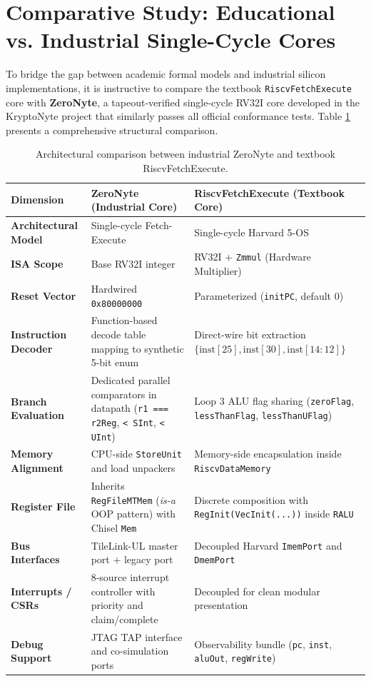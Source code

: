 \section{Comparative Study: Educational vs. Industrial Single-Cycle Cores}\label{riscvComparison}

To bridge the gap between academic formal models and industrial silicon implementations, it is instructive to compare the textbook \texttt{RiscvFetchExecute} core with \textbf{ZeroNyte}, a tapeout-verified single-cycle RV32I core developed in the KryptoNyte project that similarly passes all official conformance tests. Table \ref{tab:core_comparison} presents a comprehensive structural comparison.

\begin{table}[htbp]
\centering
\small
\begin{tabular}{|l|p{6cm}|p{6cm}|}
\hline
\textbf{Dimension} & \textbf{ZeroNyte (Industrial Core)} & \textbf{RiscvFetchExecute (Textbook Core)} \\
\hline
\textbf{Architectural Model} & Single-cycle Fetch-Execute & Single-cycle Harvard 5-OS \\
\hline
\textbf{ISA Scope} & Base RV32I integer & RV32I + \texttt{Zmmul} (Hardware Multiplier) \\
\hline
\textbf{Reset Vector} & Hardwired \texttt{0x80000000} & Parameterized (\texttt{initPC}, default 0) \\
\hline
\textbf{Instruction Decoder} & Function-based decode table mapping to synthetic 5-bit enum & Direct-wire bit extraction $\{\text{inst}[25], \text{inst}[30], \text{inst}[14:12]\}$ \\
\hline
\textbf{Branch Evaluation} & Dedicated parallel comparators in datapath (\texttt{r1 === r2Reg}, \texttt{< SInt}, \texttt{< UInt}) & Loop 3 ALU flag sharing (\texttt{zeroFlag}, \texttt{lessThanFlag}, \texttt{lessThanUFlag}) \\
\hline
\textbf{Memory Alignment} & CPU-side \texttt{StoreUnit} and load unpackers & Memory-side encapsulation inside \texttt{RiscvDataMemory} \\
\hline
\textbf{Register File} & Inherits \texttt{RegFileMTMem} (\textit{is-a} OOP pattern) with Chisel \texttt{Mem} & Discrete composition with \texttt{RegInit(VecInit(...))} inside \texttt{RALU} \\
\hline
\textbf{Bus Interfaces} & TileLink-UL master port + legacy port & Decoupled Harvard \texttt{ImemPort} and \texttt{DmemPort} \\
\hline
\textbf{Interrupts / CSRs} & 8-source interrupt controller with priority and claim/complete & Decoupled for clean modular presentation \\
\hline
\textbf{Debug Support} & JTAG TAP interface and co-simulation ports & Observability bundle (\texttt{pc}, \texttt{inst}, \texttt{aluOut}, \texttt{regWrite}) \\
\hline
\end{tabular}
\caption{Architectural comparison between industrial ZeroNyte and textbook RiscvFetchExecute.}\label{tab:core_comparison}
\end{table}

